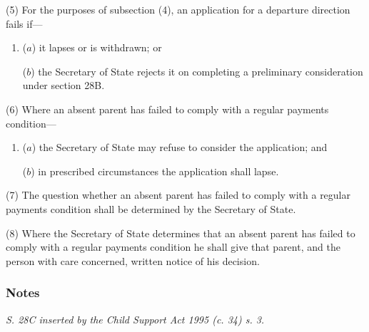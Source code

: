 \documentclass[a4paper]{article}
\newcommand\amendment[1]{\subsubsection*{Notes}{\itshape\frenchspacing\footnotesize #1 \par}}
\begin{document}
{(5)
For the purposes of subsection (4), an application for a departure direction fails if---
\begin{enumerate}\item[]
($a$) it lapses or is withdrawn; or

($b$) the Secretary of State rejects it on completing a preliminary consideration under section 28B.
\end{enumerate}

(6) Where an absent parent has failed to comply with a regular payments condition---
\begin{enumerate}\item[]
($a$) the Secretary of State may refuse to consider the application; and

($b$) in prescribed circumstances the application shall lapse.
\end{enumerate}

(7)
The question whether an absent parent has failed to comply with a regular payments condition shall be determined by the Secretary of State.

(8)
Where the Secretary of State determines that an absent parent has failed to comply with a regular payments condition he shall give that parent, and the person with care concerned, written notice of his decision.

\amendment{
S. 28C inserted by the Child Support Act 1995 (c. 34) s. 3.


}

}
\end{document}
